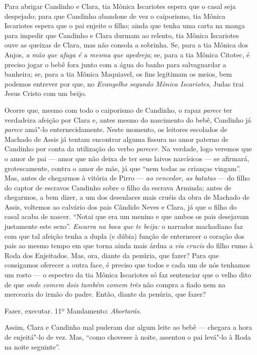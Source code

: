 Para abrigar Candinho e Clara, tia Mônica Iscariotes espera que o casal
seja despejado; para que Candinho abandone de vez o caiporismo, tia
Mônica Iscariotes espera que o pai enjeite o filho; ainda que tenha uma
carta na manga para impedir que Candinho e Clara durmam ao relento, tia
Mônica Iscariotes ouve as queixas de Clara, mas não consola a sobrinha.
Se, para a tia Mônica dos Anjos, \emph{a mão que afaga é a mesma que
apedreja}; se, para a tia Mônica Citotec, é preciso jogar o bebê fora
junto com a água do banho para salvaguardar a banheira; se, para a tia
Mônica Maquiavel, os fins legitimam os meios, bem podemos entrever por
que, no \emph{Evangelho segundo Mônica Iscariotes}, Judas trai Jesus
Cristo com um beijo.

Ocorre que, mesmo com todo o caiporismo de Candinho, o rapaz
\emph{parece} ter verdadeira afeição por Clara e, antes mesmo do
nascimento do bebê, Candinho já \emph{parece} amá"-lo enternecidamente.
Neste momento, os leitores escolados de Machado de Assis já tentam
encontrar alguma fissura no amor paterno de Candinho por conta da
utilização do verbo \emph{parecer.} Na verdade, logo veremos que o amor
de pai --- amor que não deixa de ter seus laivos narcísicos --- se
afirmará, grotescamente, contra o amor de mãe, já que ``nem todas as
crianças vingam''. Mas, antes de chegarmos à vitória de Pirro ---
\emph{ao vencedor, as batatas} --- do filho do captor de escravos
Candinho sobre o filho da escrava Arminda; antes de chegarmos, a bem
dizer, a um dos desenlaces mais cruéis da obra de Machado de Assis,
voltemos ao calvário dos pais Cândido Neves e Clara, já que o filho do
casal acaba de nascer. ``Notai que era um menino e que ambos os pais
desejavam justamente este sexo''. \emph{Escarra na boca que te beija:} o
narrador machadiano faz com que tal afeição tenha a dupla (e dúbia)
função de enternecer o coração dos pais ao mesmo tempo em que torna
ainda mais árdua a \emph{via crucis} do filho rumo à Roda dos
Enjeitados. Mas, ora, diante da penúria, que fazer? Para que consigamos
oferecer a outra face, é preciso que todos e cada um de nós tenhamos um
rosto --- o espectro da tia Mônica Iscariotes só faz sentenciar que o
velho dito de que \emph{onde comem dois também comem três} não compra a
fiado nem na mercearia do irmão do padre. Então, diante da penúria, que
fazer?

Fazer, executar. 11º Mandamento: \emph{Abortarás. }

Assim, Clara e Candinho mal puderam dar algum leite ao bebê --- chegara a
hora de enjeitá"-lo de vez. Mas, ``como chovesse à noite, assentou o pai
levá"-lo à Roda na noite seguinte''.

